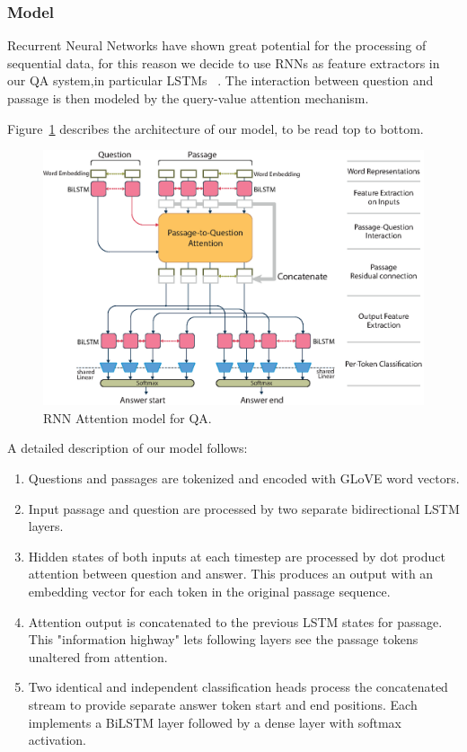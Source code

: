 \documentclass{article}
\begin{document}
\subsubsection{Model}
Recurrent Neural Networks have shown great potential for the processing of sequential data, for this reason we decide to use RNNs as feature extractors in our QA system,in particular LSTMs ~\cite{lstm}. The interaction between question and passage is then modeled by the query-value attention mechanism.

Figure~\ref{fig_1} describes the architecture of our model, to be read top to bottom.

\begin{figure}[h]
\includegraphics[width=\textwidth]{RNN_graph.eps}
\caption{RNN Attention model for QA.} \label{fig_1}
\end{figure}

A detailed description of our model follows: 

\begin{enumerate}
  \item Questions and passages are tokenized and encoded with GLoVE word vectors.
  \item Input passage and question are processed by two separate bidirectional LSTM layers.
  \item Hidden states of both inputs at each timestep are processed by dot product attention between question and answer. This produces an output with an embedding vector for each token in the original passage sequence.
  \item Attention output is concatenated to the previous LSTM states for passage.
  This "information highway" lets following layers see the passage tokens unaltered from attention.
  \item Two identical and independent classification heads process the concatenated stream to provide separate answer token start and end positions. Each implements a BiLSTM layer followed by a dense layer with softmax activation.
\end{enumerate}
\end{document}
